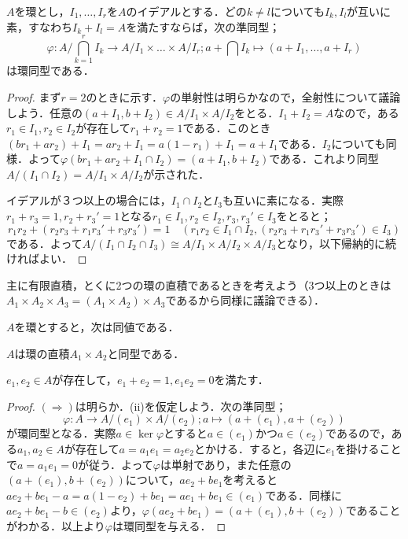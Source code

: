 \begin{thm}[中国剰余定理]\label{thm:中国剰余定理}
	$A$を環とし，$I_1,\dots,I_r$を$A$のイデアルとする．どの$k\neq l$についても$I_k,I_l$が互いに素，すなわち$I_k+I_l=A$を満たすならば，次の準同型；
	\[\varphi:A/\bigcap_{k=1}^rI_k\to A/I_1\times\dots\times A/I_r;a+\bigcap I_k\mapsto (a+I_1,\dots,a+I_r)\]
	は環同型である．
\end{thm}

\begin{proof}
	まず$r=2$のときに示す．$\varphi$の単射性は明らかなので，全射性について議論しよう．任意の$(a+I_1,b+I_2)\in A/I_1\times A/I_2$をとる．$I_1+I_2=A$なので，ある$r_1\in I_1,r_2\in I_2$が存在して$r_1+r_2=1$である．このとき$(br_1+ar_2)+I_1=ar_2+I_1=a(1-r_1)+I_1=a+I_1$である．$I_2$についても同様．よって$\varphi(br_1+ar_2+I_1\cap I_2)=(a+I_1,b+I_2)$である．これより同型$A/(I_1\cap I_2)=A/I_1\times A/I_2$が示された．
	
	イデアルが３つ以上の場合には，$I_1\cap I_2$と$I_3$も互いに素になる．実際$r_1+r_3=1,r_2+r_3'=1$となる$r_1\in I_1,r_2\in I_2,r_3,r_3'\in I_3$をとると；
	\[r_1r_2+(r_2r_3+r_1r_3'+r_3r_3')=1\quad(r_1r_2\in I_1\cap I_2, (r_2r_3+r_1r_3'+r_3r_3')\in I_3)\]
	である．よって$A/(I_1\cap I_2\cap I_3)\cong A/I_1\times A/I_2\times A/I_3$となり，以下帰納的に続ければよい．
\end{proof}

主に有限直積，とくに2つの環の直積であるときを考えよう（3つ以上のときは$A_1\times A_2\times A_3=(A_1\times A_2)\times A_3$であるから同様に議論できる）．

\begin{prop}
	$A$を環とすると，次は同値である．
	\begin{sakura}
		\item $A$は環の直積$A_1\times A_2$と同型である．
		\item $e_1,e_2\in A$が存在して，$e_1+e_2=1,e_1e_2=0$を満たす．
	\end{sakura}
\end{prop}

\begin{proof}
	$(\Longrightarrow)$は明らか．(ii)を仮定しよう．次の準同型；
	\[\varphi:A\to A/(e_1)\times A/(e_2);a\mapsto (a+(e_1),a+(e_2))\]
	が環同型となる．実際$a\in\ker\varphi$とすると$a\in (e_1)$かつ$a\in (e_2)$であるので，ある$a_1,a_2\in A$が存在して$a=a_1e_1=a_2e_2$とかける．すると，各辺に$e_1$を掛けることで$a=a_1e_1=0$が従う．よって$\varphi$は単射であり，また任意の$(a+(e_1),b+(e_2))$について，$ae_2+be_1$を考えると$ae_2+be_1-a=a(1-e_2)+be_1=ae_1+be_1\in (e_1)$である．同様に$ae_2+be_1-b\in (e_2)$より，$\varphi(ae_2+be_1)=(a+(e_1),b+(e_2))$であることがわかる．以上より$\varphi$は環同型を与える．
\end{proof}

